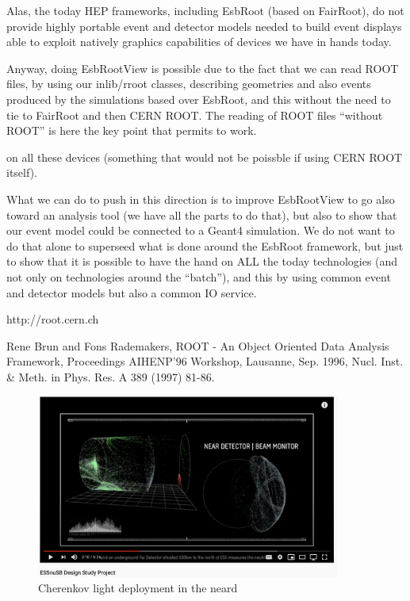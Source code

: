 Alas, the today HEP frameworks, including EsbRoot (based on FairRoot), do not provide
highly portable event and detector models needed to build
event displays able to exploit natively graphics capabilities of
devices we have in hands today.

Anyway, doing EsbRootView is possible due to the fact that we can read ROOT
files, by using our inlib/rroot classes, describing geometries and also events produced by the
simulations based over EsbRoot, and this without the need to tie to
FairRoot and then CERN ROOT. The reading of ROOT files ``without ROOT'' is here the key point that
permits to work.

on all these devices (something
that would not be poissble if using CERN ROOT itself).

What we can do to push in this
direction is to improve EsbRootView to go also toward an analysis
tool (we have all the parts to do that), but also to show that our
event model could be connected to a Geant4 simulation. We do not want
to do that alone to superseed what is done around the EsbRoot
framework, but just to show that it is possible to have the hand on
ALL the today technologies (and not only on technologies around the
``batch''), and this by using common event and detector models but also a common
IO service.

\cite{CERN-ROOT}
 http://root.cern.ch

Rene Brun and Fons Rademakers, ROOT - An Object Oriented Data Analysis Framework,
Proceedings AIHENP'96 Workshop, Lausanne, Sep. 1996,
Nucl. Inst. & Meth. in Phys. Res. A 389 (1997) 81-86.


\begin{figure}[h]
\centering
\includegraphics[width=10cm,clip]{youtube_neard}
\caption{Cherenkov light deployment in the neard}
\label{fig-youtube-neard}
\end{figure}

